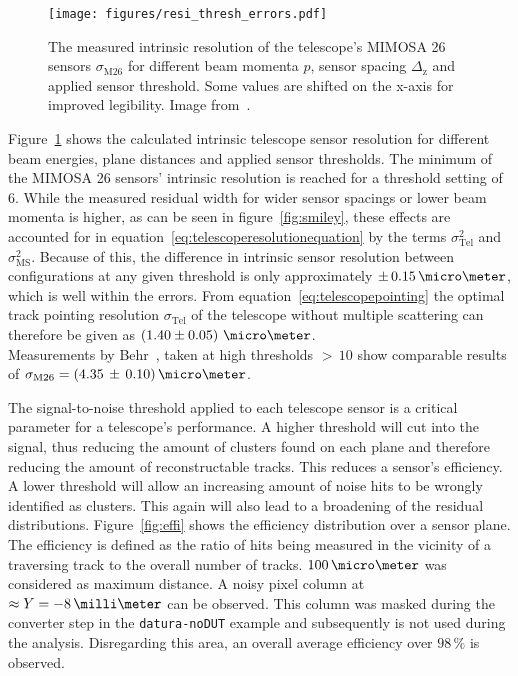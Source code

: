 \begin{figure}[tbp]
\centering

\texttt{[image: figures/resi\_thresh\_errors.pdf]}
\caption[Telescope intrinsic sensor resolution for different threshold settings, beam momenta and geometries~\cite{ref:thomas}]{
 The measured intrinsic resolution of the \Datura telescope's MIMOSA 26 sensors $\sigma_{\textrm{M26}}$ for different beam momenta $p$, sensor spacing $\Delta_{\textrm{z}}$ and applied sensor threshold.
Some values are shifted on the x-axis for improved legibility.
Image from~\cite{ref:thomas}.}
\label{fig:resivsenergy}
\end{figure}

Figure~\ref{fig:resivsenergy} shows the calculated intrinsic telescope sensor resolution for different beam energies, plane distances and applied sensor thresholds.
The minimum of the MIMOSA 26 sensors' intrinsic resolution is reached for a threshold setting of $6$.
While the measured residual width for wider sensor spacings or lower beam momenta is higher, as can be seen in figure~\ref{fig:smiley},
 these effects are accounted for in equation~\ref{eq:telescoperesolutionequation} by the terms $\sigma_{\textrm{Tel}}^2$ and $\sigma_{\textrm{MS}}^2$.
Because of this, the difference in intrinsic sensor resolution between configurations at any given threshold is only approximately $\pm\,0.15\,\micro\meter$, which is well within the errors.
From equation~\ref{eq:telescopepointing} the optimal track pointing resolution $\sigma_{\textrm{Tel}}$ of the \Datura telescope without multiple scattering
 can therefore be given as $\left( 1.40 \pm 0.05 \right)\,\micro\meter$.\\
Measurements by Behr~\cite{ref:j.behrmeasurements}, taken at high thresholds $>\,10$ show comparable results of $\sigma_{\textrm{M26}} = (4.35\,\pm\,0.10)\,\micro\meter$.

The signal-to-noise threshold applied to each telescope sensor is a critical parameter for a telescope's performance.
A higher threshold will cut into the signal, thus reducing the amount of clusters found on each plane and therefore reducing the amount of reconstructable tracks.
This reduces a sensor's efficiency.
A lower threshold will allow an increasing amount of noise hits to be wrongly identified as clusters.
This again will also lead to a broadening of the residual distributions.
Figure~\ref{fig:effi} shows the efficiency distribution over a sensor plane.
The efficiency is defined as the ratio of hits being measured in the vicinity of a traversing track to the overall number of tracks.
$100\,\micro\meter$ was considered as maximum distance.
A noisy pixel column at $\approx Y = -8\,\milli\meter$ can be observed.
This column was masked during the converter step in the \texttt{datura-noDUT} example and subsequently is not used during the analysis.
Disregarding this area, an overall average efficiency over $98\,\%$ is observed.

